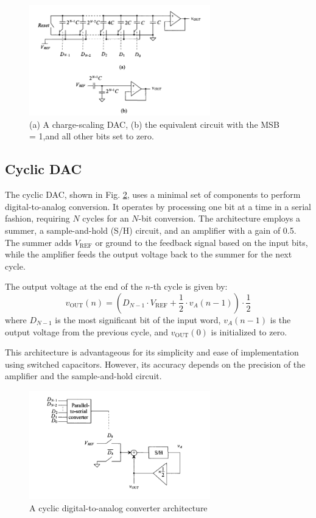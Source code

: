 \begin{figure}[H]
	\centering
	\includegraphics[width=0.7\textwidth]{figs/charge_scaling_dac.png}
	\caption{(a) A charge-scaling DAC, (b) the equivalent circuit with the MSB = 1,and all other bits set to zero.}
	\label{fig:charge_scaling_dac}
	\vspace{0.5cm}
\end{figure}
\subsection{Cyclic DAC}
The cyclic DAC, shown in Fig. \ref{fig:cyclic_dac}, uses a minimal set of components to perform digital-to-analog conversion. It operates by processing one bit at a time in a serial fashion, requiring $N$ cycles for an $N$-bit conversion. The architecture employs a summer, a sample-and-hold (S/H) circuit, and an amplifier with a gain of 0.5. The summer adds $V_{\text{REF}}$ or ground to the feedback signal based on the input bits, while the amplifier feeds the output voltage back to the summer for the next cycle.

The output voltage at the end of the $n$-th cycle is given by:
\begin{equation}
v_{\text{OUT}}(n) = \left( D_{N-1} \cdot V_{\text{REF}} + \frac{1}{2} \cdot v_A(n-1) \right) \cdot \frac{1}{2}
\end{equation}
where $D_{N-1}$ is the most significant bit of the input word, $v_A(n-1)$ is the output voltage from the previous cycle, and $v_{\text{OUT}}(0)$ is initialized to zero.

This architecture is advantageous for its simplicity and ease of implementation using switched capacitors. However, its accuracy depends on the precision of the amplifier and the sample-and-hold circuit.

\begin{figure}[H]
	\centering
	\includegraphics[width=0.7\textwidth]{figs/cyclic_dac.png}
	\caption{A cyclic digital-to-analog converter architecture}
	\label{fig:cyclic_dac}
	\vspace{0.5cm}
\end{figure}
